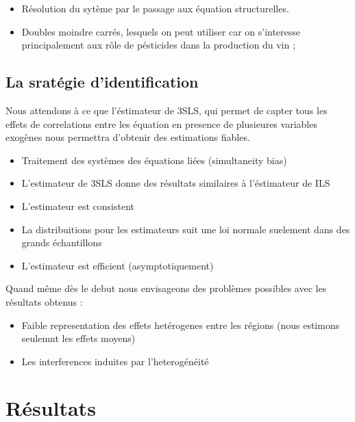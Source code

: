 \documentclass[11pt,]{article}
\providecommand{\tightlist}{%
  \setlength{\itemsep}{0pt}\setlength{\parskip}{0pt}}
\begin{document}
\begin{itemize}
  \item Résolution du sytème par le passage aux équation structurelles.
  \item Doubles moindre carrés, lesquels on peut utiliser car on s'interesse principalement aux rôle de pésticides dans la production du vin ;
\end{itemize}

\FloatBarrier

\FloatBarrier

\FloatBarrier

\hypertarget{la-srategie-didentification}{%
\subsection{La sratégie
d'identification}\label{la-srategie-didentification}}

Nous attendons à ce que l'éstimateur de 3SLS, qui permet de capter tous
les effets de correlations entre les équation en presence de plusieures
variables exogènes nous permettra d'obtenir des estimations fiables.

\begin{itemize}
\tightlist
\item
  Traitement des systèmes des équations liées (simultaneity bias)
\item
  L'estimateur de 3SLS donne des résultats similaires à l'éstimateur de
  ILS
\item
  L'estimateur est consistent
\item
  La distribuitions pour les estimateurs suit une loi normale suelement
  dans des grands échantillons
\item
  L'estimateur est efficient (asymptotiquement)
\end{itemize}

Quand même dès le debut nous envisageons des problèmes possibles avec
les résultats obtenus :

\begin{itemize}
\tightlist
\item
  Faible representation des effets hetérogenes entre les régions (nous
  estimons seulemnt les effets moyens)
\item
  Les interferences induites par l'heterogénéité
\end{itemize}

\hypertarget{resultats}{%
\section{Résultats}\label{resultats}}
\end{document}
